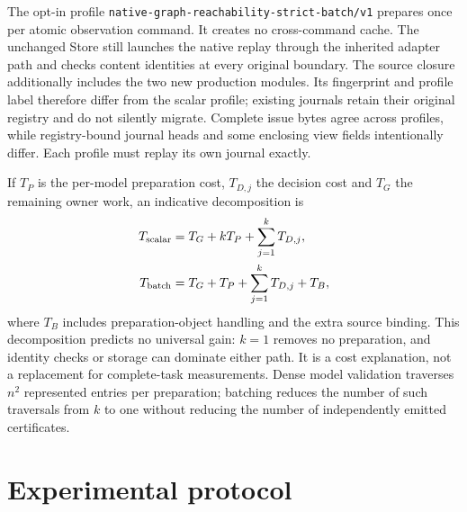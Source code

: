 \documentclass[11pt,a4paper]{article}
\theoremstyle{definition}\newtheorem{definition}[theorem]{Definition}
\begin{document}
The opt-in profile \texttt{native-graph-reachability-strict-batch/v1} prepares once per atomic observation command. It creates no cross-command cache. The unchanged Store still launches the native replay through the inherited adapter path and checks content identities at every original boundary. The source closure additionally includes the two new production modules. Its fingerprint and profile label therefore differ from the scalar profile; existing journals retain their original registry and do not silently migrate. Complete issue bytes agree across profiles, while registry-bound journal heads and some enclosing view fields intentionally differ. Each profile must replay its own journal exactly.

If $T_P$ is the per-model preparation cost, $T_{D,j}$ the decision cost and $T_G$ the remaining owner work, an indicative decomposition is
\begin{align}\label{eq:batchcost}
 T_{\rm scalar}&=T_G+kT_P+\sum_{j=1}^{k}T_{D,j},\nonumber\\
 T_{\rm batch}&=T_G+T_P+\sum_{j=1}^{k}T_{D,j}+T_B,
\end{align}
where $T_B$ includes preparation-object handling and the extra source binding. This decomposition predicts no universal gain: $k=1$ removes no preparation, and identity checks or storage can dominate either path. It is a cost explanation, not a replacement for complete-task measurements. Dense model validation traverses $n^2$ represented entries per preparation; batching reduces the number of such traversals from $k$ to one without reducing the number of independently emitted certificates.

\section{Experimental protocol}
\end{document}
